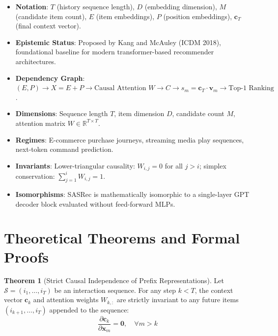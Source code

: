 \documentclass[11pt,a4paper]{article}
\theoremstyle{definition}
\newtheorem{theorem}{\textbf{Theorem}}[section]
\begin{document}
\begin{itemize}
    \item \textbf{Notation}: $T$ (history sequence length), $D$ (embedding dimension), $M$ (candidate item count), $E$ (item embeddings), $P$ (position embeddings), $\mathbf{c}_T$ (final context vector).
    \item \textbf{Epistemic Status}: Proposed by Kang and McAuley (ICDM 2018), foundational baseline for modern transformer-based recommender architectures.
    \item \textbf{Dependency Graph}: $(E, P) \to X = E + P \to \text{Causal Attention } W \to C \to s_m = \mathbf{c}_T \cdot \mathbf{v}_m \to \text{Top-1 Ranking}$.
    \item \textbf{Dimensions}: Sequence length $T$, item dimension $D$, candidate count $M$, attention matrix $W \in \mathbb{R}^{T \times T}$.
    \item \textbf{Regimes}: E-commerce purchase journeys, streaming media play sequences, next-token command prediction.
    \item \textbf{Invariants}: Lower-triangular causality: $W_{i, j} = 0$ for all $j > i$; simplex conservation: $\sum_{j=1}^i W_{i, j} = 1$.
    \item \textbf{Isomorphisms}: SASRec is mathematically isomorphic to a single-layer GPT decoder block evaluated without feed-forward MLPs.
\end{itemize}

\section{Theoretical Theorems and Formal Proofs}

\begin{theorem}[Strict Causal Independence of Prefix Representations]
Let $\mathcal{S} = (i_1, \dots, i_T)$ be an interaction sequence. For any step $k < T$, the context vector $\mathbf{c}_k$ and attention weights $W_{k, :}$ are strictly invariant to any future items $(i_{k+1}, \dots, i_T)$ appended to the sequence:
{\boldmath
\begin{equation}
\frac{\partial \mathbf{c}_k}{\partial \mathbf{x}_m} = \mathbf{0}, \quad \forall m > k
\end{equation}
}
\end{theorem}
\end{document}
